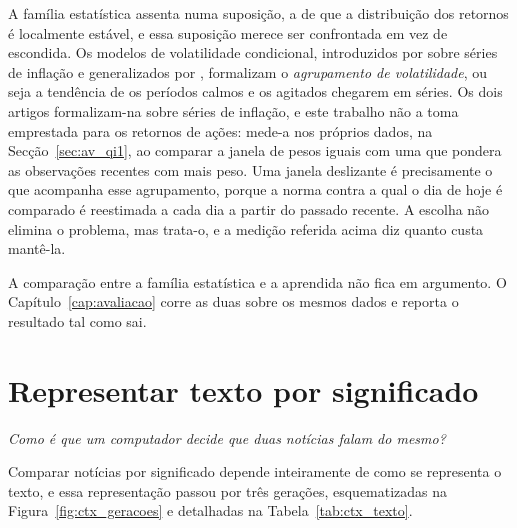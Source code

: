 A família estatística assenta numa suposição, a de que a distribuição dos retornos é localmente
estável, e essa suposição merece ser confrontada em vez de escondida. Os modelos de volatilidade
condicional, introduzidos por \textcite{engle1982arch} sobre séries de inflação e generalizados por
\textcite{bollerslev1986garch}, formalizam o \emph{agrupamento de volatilidade}, ou seja a tendência
de os períodos calmos e os agitados chegarem em séries. Os dois artigos formalizam-na sobre séries
de inflação, e este trabalho não a toma emprestada para os retornos de ações: mede-a nos próprios
dados, na Secção~\ref{sec:av_qi1}, ao comparar a janela de pesos iguais com uma que pondera as
observações recentes com mais peso. Uma janela
deslizante é precisamente o que acompanha esse agrupamento, porque a norma contra a qual o dia de
hoje é comparado é reestimada a cada dia a partir do passado recente. A escolha não elimina o
problema, mas trata-o, e a medição referida acima diz quanto custa mantê-la.

A comparação entre a família estatística e a aprendida não fica em argumento. O
Capítulo~\ref{cap:avaliacao} corre as duas sobre os mesmos dados e reporta o resultado tal como sai.

\section{Representar texto por significado}
\label{sec:ctx_texto}

\emph{Como é que um computador decide que duas notícias falam do mesmo?}

Comparar notícias por significado depende inteiramente de como se representa o texto, e essa
representação passou por três gerações, esquematizadas na Figura~\ref{fig:ctx_geracoes} e detalhadas
na Tabela~\ref{tab:ctx_texto}.

